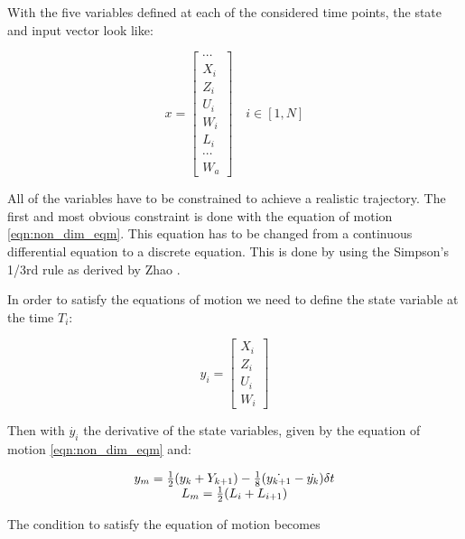 \par With the five variables defined at each of the considered time points, the state and input vector look like:

\begin{equation}
  x= 
  \begin{bmatrix}
    \cdots \\
    X_i \\
    Z_i \\
    U_i \\
    W_i \\
    L_i \\
    \cdots \\
    W_a
  \end{bmatrix}
  \quad i \in [1,N]
  \label{eqn:big_vector}
\end{equation}

\par All of the variables have to be constrained to achieve a realistic trajectory.
The first and most obvious constraint is done with the equation of motion \ref{eqn:non_dim_eqm}.
This equation has to be changed from a continuous differential equation to a discrete equation.
This is done by using the Simpson's 1/3rd rule as derived by Zhao \cite{zhao2004optimal}.

In order to satisfy the equations of motion we need to define the state variable at the time $T_i$:

\begin{equation}
  y_i= \begin{bmatrix}
    X_i \\
    Z_i \\
    U_i \\
    W_i 
  \end{bmatrix}
  \label{eqn:state_i}
\end{equation}

Then with $\dot{y_i}$ the derivative of the state variables, given by the equation of motion \ref{eqn:non_dim_eqm} and:

\begin{equation}
  \begin{array}[c]{c}
    y_m= \frac{1}{2}(y_k + Y_{k+1}) - \frac{1}{8}(\dot{y_{k+1}} - \dot{y_k})\delta t \\
    L_m=\frac{1}{2}(L_i + L_{i+1})
  \end{array}
  \label{eqn:simpson_middle}
\end{equation}

The condition to satisfy the equation of motion becomes

